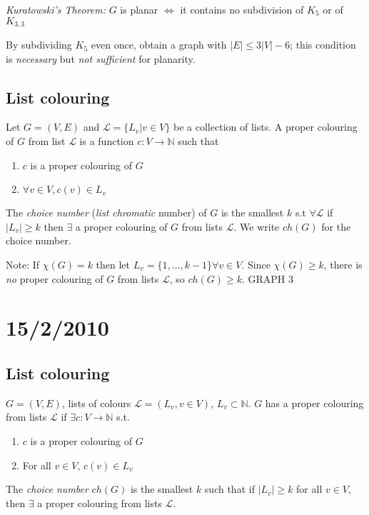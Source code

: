 \documentclass{article}
\begin{document}
\begin{thm}
\emph{Kuratowski's Theorem:} $G$ is planar $\iff$ it contains no subdivision of $K_5$ or of $K_{3,3}$
\end{thm}

\begin{rem}
By subdividing $K_5$ even once, obtain a graph with $|E| \leq 3 |V| - 6$; this condition is \emph{necessary} but \emph{not sufficient} for planarity.
\end{rem}

\subsection*{List colouring}

\begin{defn}
Let $G=(V,E)$ and $\mathcal{L} = \{ L_v | v \in V \}$ be a collection of lists.  A proper colouring of $G$ from list $\mathcal{L}$ is a function $c: V \rightarrow \mathbb{N}$ such that
\begin{enumerate}
 \item $c$ is a proper colouring of $G$
\item $\forall v \in V, c(v) \in L_v$
\end{enumerate}
The \emph{choice number} (\emph{list chromatic} number) of $G$ is the smallest $k$ s.t $\forall \mathcal{L} $ if $|L_v| \geq k$  then $\exists $ a proper colouring of $G$ from lists $\mathcal{L}$.  We write $ch(G)$ for the choice number. 
\end{defn}

Note: If $\chi(G)=k$ then let $L_v = \{1, \ldots, k-1\} \forall v \in V$.  Since $\chi(G) \geq k$, there is \emph{no} proper colouring of $G$ from lists $\mathcal{L}$, so $ch(G)\geq k$.
GRAPH 3

\section*{15/2/2010}

\subsection*{List colouring}

\begin{rec}
$G=(V,E)$, lists of colours $\mathcal{L}=(L_v, v \in V)$, $L_v \subset \mathbb{N}$.  $G$ has a proper colouring from lists $\mathcal{L}$ if $\exists c: V \rightarrow \mathbb{N}$ s.t.
\begin{enumerate}
 \item $c$ is a proper colouring of $G$
\item For all $v \in V$, $c(v) \in L_v$
\end{enumerate}

The \emph{choice number} $ch(G)$ is the smallest  $k$ such that if $|L_v| \geq k$ for all $v \in V$, then $\exists$ a proper colouring from lists $\mathcal{L}$.
\end{rec}
\end{document}
